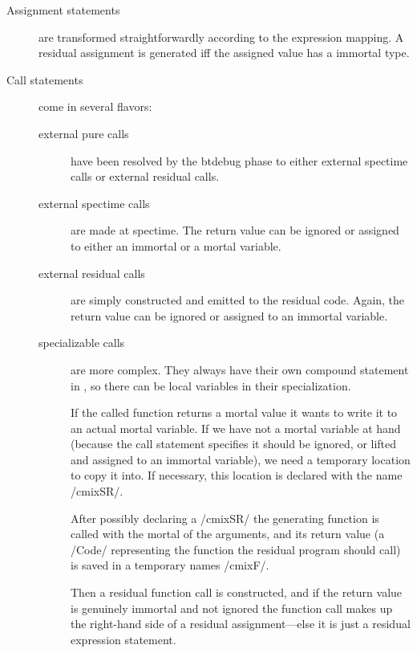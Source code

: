 \begin{docpart}
\begin{description}
\item[Assignment statements] are transformed straightforwardly
	according to the expression mapping. A residual assignment
	is generated iff the assigned value has a immortal type.
\item[Call statements] come in several flavors:
	\begin{description}
	\item[external pure calls] have been resolved by the
		btdebug phase to either external spectime calls
		or external residual calls.
	\item[external spectime calls] are made at spectime.
		The return value can be ignored or assigned to
		either an immortal or a mortal variable.
	\item[external residual calls] are simply constructed
		and emitted to the residual code. Again, the
		return value can be ignored or assigned
		to an immortal variable.
	\item[specializable calls] are more complex. They always
		have their own compound statement in \Pgen, so there
		can be local variables in their specialization.

		If the called function returns a mortal
		value it wants to write it to an actual mortal
		variable. If we have not a mortal variable at
		hand (because the call statement specifies
		it should be ignored, or lifted and assigned to an immortal
		variable), we need a temporary location to copy
		it into. If necessary, this location is declared
		with the name /cmixSR/.

		After possibly declaring a /cmixSR/ the generating
		function is called with the mortal of the arguments,
		and its return value (a /Code/ representing the
		function the residual program should call) is saved
		in a temporary names /cmixF/.

		Then a residual function call is constructed, and
		if the return value is genuinely immortal and not
		ignored the function call makes up the right-hand side
		of a residual assignment---else it is just a residual
		expression statement.


\end{description}
\end{description}
\end{docpart}
